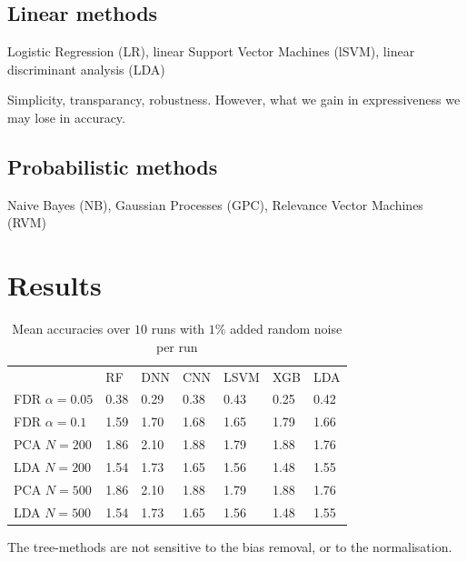 \documentclass[a4paper,10pt]{article}
\begin{document}
\subsection{Linear methods}

Logistic Regression (LR), 
linear Support Vector Machines (lSVM), 
linear discriminant analysis (LDA)

Simplicity, transparancy, robustness. However, what we gain in expressiveness we may lose in accuracy.

\subsection{Probabilistic methods}
%
Naive Bayes (NB), Gaussian Processes (GPC), Relevance Vector Machines (RVM)


\section{Results}
% 
\begin{table}[htp]
\centering
\caption{Mean accuracies over $10$ runs with $1\%$ added random noise per run}
\label{tab:diversitymetrics}
\begin{tabular}{lllllll}
				& RF     & DNN 		& CNN  		& LSVM 		& 	XGB 	& 	LDA  \\
FDR $\alpha=0.05$		& 0.38   &  0.29      	&  0.38     	&  0.43    	& 0.25    	& 0.42  \\
FDR $\alpha=0.1$ 		& 1.59   &  1.70      	&  1.68 	&  1.65    	& 1.79    	& 1.66  \\
PCA $N=200$    			& 1.86   &  2.10      	&  1.88         &  1.79    	& 1.88          & 1.76  \\
LDA $N=200$        		& 1.54   &  1.73      	&  1.65         &  1.56    	& 1.48          & 1.55  \\
PCA $N=500$    			& 1.86   &  2.10      	&  1.88         &  1.79    	& 1.88          & 1.76  \\
LDA $N=500$        		& 1.54   &  1.73      	&  1.65         &  1.56    	& 1.48          & 1.55  \\
\end{tabular}
\end{table}
%

The tree-methods are not sensitive to the bias removal, or to the normalisation.
\end{document}
